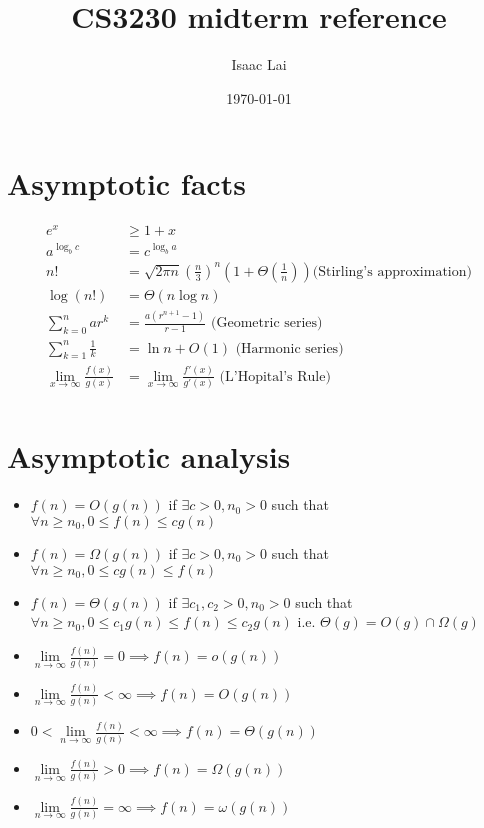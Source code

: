 \documentclass[11pt]{article}
\title{CS3230 midterm reference}
\date{\today}
\author{Isaac Lai}
\theoremstyle{remark}
\begin{document}
\maketitle
\section{Asymptotic facts}
\begin{align*}
    e^x&\geq 1+x\\
    a^{\log_b c}&=c^{\log_b a}\\
    n!&=\sqrt{2\pi n}\left(\frac{n}{3}\right)^n\left(1+\Theta\left(\frac{1}{n}\right)\right)\text{
    (Stirling's approximation)}\\
    \log(n!)&=\Theta(n\log n)\\
    \sum_{k=0}^n ar^k&= \frac{a(r^{n+1}-1)}{r-1}\text{ (Geometric series)}\\
    \sum_{k=1}^n \frac{1}{k}&=\ln n+O(1)\text{ (Harmonic series)}\\
    \lim_{x\to\infty}\frac{f(x)}{g(x)}&=\lim_{x\to\infty}\frac{f'(x)}{g'(x)}\text{ (L'Hopital's Rule)}\\
\end{align*}
\section{Asymptotic analysis}
\begin{itemize}
    \item $f(n)=O(g(n))$ if  $\exists c>0,n_0>0$ such that $\forall n\geq n_0, 0\leq f(n)\leq cg(n)$
    \item  $f(n)=\Omega(g(n))$ if  $\exists c>0,n_0>0$ such that $\forall n\geq n_0, 0\leq cg(n)\leq f(n)$
    \item  $f(n)=\Theta(g(n))$ if $\exists c_1,c_2>0,n_0>0$ such that $\forall n\geq n_0, 0\leq c_1g(n)\leq
        f(n)\leq c_2g(n)$ i.e. $\Theta(g)=O(g)\cap\Omega(g)$ 
    \item $\lim\limits_{n\to\infty}\frac{f(n)}{g(n)}=0\implies f(n)=o(g(n))$ 
    \item $\lim\limits_{n\to\infty}\frac{f(n)}{g(n)}<\infty\implies f(n)=O(g(n))$    
    \item $0<\lim\limits_{n\to\infty}\frac{f(n)}{g(n)}<\infty\implies f(n)=\Theta(g(n))$
    \item $\lim\limits_{n\to\infty}\frac{f(n)}{g(n)}>0\implies f(n)=\Omega(g(n))$  
    \item $\lim\limits_{n\to\infty}\frac{f(n)}{g(n)}=\infty\implies f(n)=\omega(g(n))$   
\end{itemize}
\end{document}
